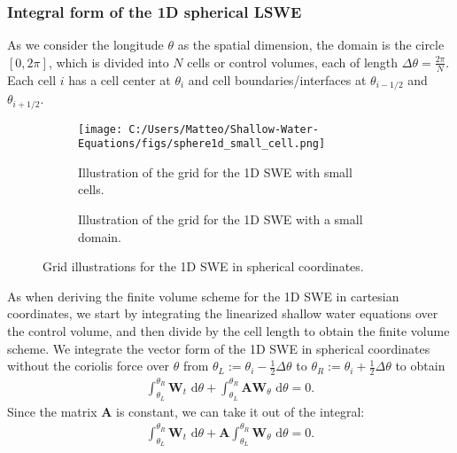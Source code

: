 \subsubsection*{Integral form of the 1D spherical LSWE}
As we consider the longitude $\theta$ as the spatial dimension, the domain is the circle $[0, 2\pi]$, which is divided into $N$ cells or control volumes, each of length $\Delta \theta = \frac{2\pi}{N}$.
Each cell $i$ has a cell center at $\theta_i$ and cell boundaries/interfaces at $\theta_{i-1/2}$ and $\theta_{i+1/2}$.
\begin{figure}[H]
    \centering
    \begin{subfigure}{0.4\textwidth}
        \centering
        \texttt{[image: C:/Users/Matteo/Shallow-Water-Equations/figs/sphere1d\_small\_cell.png]}
        \caption{Illustration of the grid for the 1D SWE with small cells.}\label{fig:sphere1d_small_cell}
    \end{subfigure}%
    \begin{subfigure}{0.35\textwidth}
        \centering
        \caption{Illustration of the grid for the 1D SWE with a small domain.}\label{fig:sphere1d_small_domain}
    \end{subfigure}
    \caption{Grid illustrations for the 1D SWE in spherical coordinates.}\label{fig:sphere1d_combined}
\end{figure}
As when deriving the finite volume scheme for the 1D SWE in cartesian coordinates, we start by integrating the linearized shallow water equations over the control volume, and then divide by the cell length to obtain the finite volume scheme.
We integrate the vector form of the 1D SWE in spherical coordinates without the coriolis force over $\theta$ from $\theta_L := \theta_i - \frac{1}{2} \Delta \theta $ to $\theta_R := \theta_i + \frac{1}{2}\Delta \theta $ to obtain
\begin{align*}
    \int_{\theta_L}^{\theta_R} \mathbf{W}_t \text{ d}\theta + \int_{\theta_L}^{\theta_R} \mathbf{A} \mathbf{W}_\theta \text{ d}\theta = 0.
\end{align*}
Since the matrix $\mathbf{A}$ is constant, we can take it out of the integral:
\begin{align*}
    \int_{\theta_L}^{\theta_R} \mathbf{W}_t \text{ d}\theta + \mathbf{A} \int_{\theta_L}^{\theta_R} \mathbf{W}_\theta \text{ d}\theta = 0.
\end{align*}
